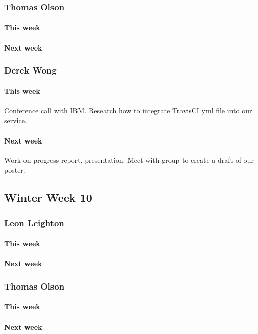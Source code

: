 \documentclass[10pt,letterpaper,onecolumn,draftclsnofoot]{IEEEtran}
\begin{document}
\subsubsection{Thomas Olson}
\paragraph{This week}
\paragraph{Next week}


\subsubsection{Derek Wong}
\paragraph{This week}Conference call with IBM\@.
Research how to integrate TravisCI yml file into our service.

\paragraph{Next week}Work on progress report, presentation.            
Meet with group to create a draft of our poster.

\subsection{Winter Week 10}
\subsubsection{Leon Leighton}
\paragraph{This week}
\paragraph{Next week}


\subsubsection{Thomas Olson}
\paragraph{This week}
\paragraph{Next week}
\end{document}
